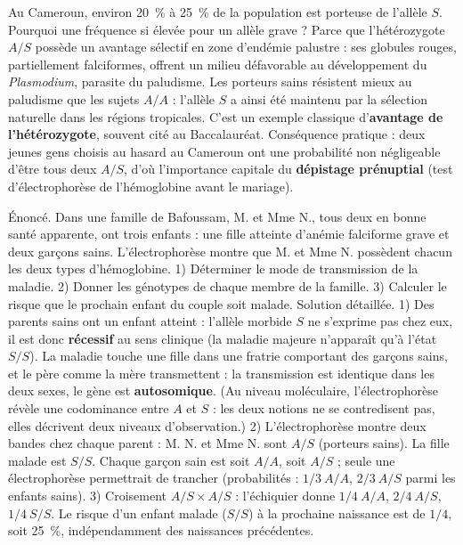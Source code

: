 \documentclass[11pt]{article}
\begin{document}
\begin{savaistu}
Au Cameroun, environ \SI{20}{\%} à \SI{25}{\%} de la population est porteuse de l'allèle $S$. Pourquoi une fréquence si élevée pour un allèle grave ? Parce que l'hétérozygote $A/S$ possède un avantage sélectif en zone d'endémie palustre : ses globules rouges, partiellement falciformes, offrent un milieu défavorable au développement du \emph{Plasmodium}, parasite du paludisme. Les porteurs sains résistent mieux au paludisme que les sujets $A/A$ : l'allèle $S$ a ainsi été maintenu par la sélection naturelle dans les régions tropicales. C'est un exemple classique d'\textbf{avantage de l'hétérozygote}, souvent cité au Baccalauréat. Conséquence pratique : deux jeunes gens choisis au hasard au Cameroun ont une probabilité non négligeable d'être tous deux $A/S$, d'où l'importance capitale du \textbf{dépistage prénuptial} (test d'électrophorèse de l'hémoglobine avant le mariage).
\end{savaistu}

\begin{exoresolu}
Énoncé. Dans une famille de Bafoussam, M. et Mme N., tous deux en bonne santé apparente, ont trois enfants : une fille atteinte d'anémie falciforme grave et deux garçons sains. L'électrophorèse montre que M. et Mme N. possèdent chacun les deux types d'hémoglobine. 1) Déterminer le mode de transmission de la maladie. 2) Donner les génotypes de chaque membre de la famille. 3) Calculer le risque que le prochain enfant du couple soit malade.
\tcblower
Solution détaillée.
1) Des parents sains ont un enfant atteint : l'allèle morbide $S$ ne s'exprime pas chez eux, il est donc \textbf{récessif} au sens clinique (la maladie majeure n'apparaît qu'à l'état $S/S$). La maladie touche une fille dans une fratrie comportant des garçons sains, et le père comme la mère transmettent : la transmission est identique dans les deux sexes, le gène est \textbf{autosomique}. (Au niveau moléculaire, l'électrophorèse révèle une codominance entre $A$ et $S$ : les deux notions ne se contredisent pas, elles décrivent deux niveaux d'observation.)
2) L'électrophorèse montre deux bandes chez chaque parent : M. N. et Mme N. sont $A/S$ (porteurs sains). La fille malade est $S/S$. Chaque garçon sain est soit $A/A$, soit $A/S$ ; seule une électrophorèse permettrait de trancher (probabilités : $1/3\ A/A$, $2/3\ A/S$ parmi les enfants sains).
3) Croisement $A/S \times A/S$ : l'échiquier donne $1/4\ A/A$, $2/4\ A/S$, $1/4\ S/S$. Le risque d'un enfant malade ($S/S$) à la prochaine naissance est de $1/4$, soit \SI{25}{\%}, indépendamment des naissances précédentes.
\end{exoresolu}
\end{document}
